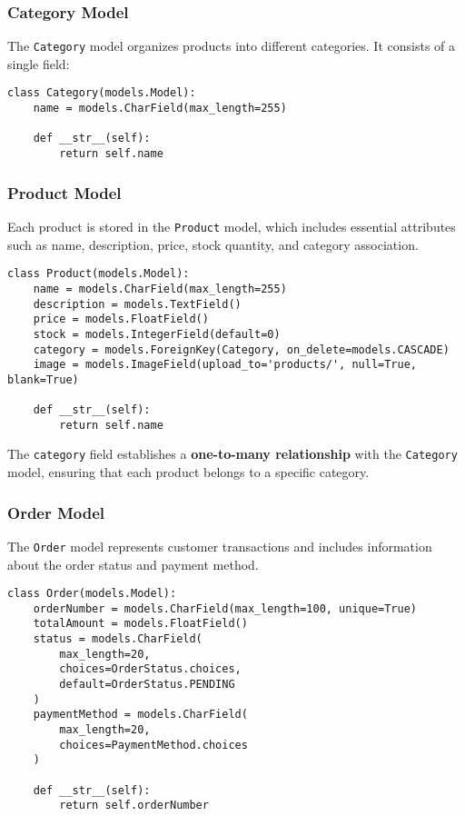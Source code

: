 \subsubsection{Category Model}
The \texttt{Category} model organizes products into different categories. It consists of a single field:

\begin{verbatim}
class Category(models.Model):
    name = models.CharField(max_length=255)

    def __str__(self):
        return self.name
\end{verbatim}

\subsubsection{Product Model}
Each product is stored in the \texttt{Product} model, which includes essential attributes such as name, description, price, stock quantity, and category association.

\begin{verbatim}
class Product(models.Model):
    name = models.CharField(max_length=255)
    description = models.TextField()
    price = models.FloatField()
    stock = models.IntegerField(default=0)
    category = models.ForeignKey(Category, on_delete=models.CASCADE) 
    image = models.ImageField(upload_to='products/', null=True, blank=True)

    def __str__(self):
        return self.name
\end{verbatim}

The \texttt{category} field establishes a \textbf{one-to-many relationship} with the \texttt{Category} model, ensuring that each product belongs to a specific category.

\subsubsection{Order Model}
The \texttt{Order} model represents customer transactions and includes information about the order status and payment method.

\begin{verbatim}
class Order(models.Model):
    orderNumber = models.CharField(max_length=100, unique=True)
    totalAmount = models.FloatField()
    status = models.CharField(
        max_length=20, 
        choices=OrderStatus.choices, 
        default=OrderStatus.PENDING
    )
    paymentMethod = models.CharField(
        max_length=20, 
        choices=PaymentMethod.choices
    )

    def __str__(self):
        return self.orderNumber
\end{verbatim}

